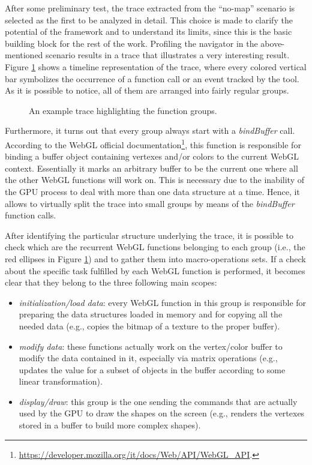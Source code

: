 After some preliminary test, the trace extracted from the ``no-map'' scenario
is selected as the first to be analyzed in detail. This choice is made
to clarify the potential of the framework and to understand its limits, since
this is the basic building block for the rest of the work.
Profiling the navigator in the above-mentioned scenario results in a trace that
illustrates a very interesting result. Figure \ref{img:no_map_overview}
shows a timeline representation of the trace, where every colored vertical bar
symbolizes the occurrence of a function call or an event tracked by the tool.
As it is possible to notice, all of them are arranged into fairly regular groups.
\begin{figure}[!htb]
    \caption{An example trace highlighting the function groups.}
    \label{img:no_map_overview}
\end{figure}

Furthermore, it turns out that every group always start with a \emph{bindBuffer}
call. According to the WebGL official documentation\footnote{
\url{https://developer.mozilla.org/it/docs/Web/API/WebGL_API}.}, this function is
responsible for binding a buffer object containing vertexes and/or colors to the
current WebGL context. Essentially it marks an arbitrary buffer to be the current
one where all the other WebGL functions will work on. This is necessary due to the
inability of the GPU process to deal with more than one data structure at a time.
Hence, it allows to virtually split the trace into small groups by means of the
\emph{bindBuffer} function calls.

After identifying the particular structure underlying the trace, it is possible to check
which are the recurrent WebGL functions belonging to each group (i.e., the red ellipses
in Figure \ref{img:no_map_overview}) and to gather them into macro-operations sets.
If a check about the specific task fulfilled by each WebGL function is performed, it
becomes clear that they belong to the three following main scopes:
\begin{itemize}
    \item \emph{initialization/load data}: every WebGL function in this group
        is responsible for preparing the data structures loaded in memory
        and for copying all the needed data (e.g., copies the bitmap of a texture
        to the proper buffer).
    \item \emph{modify data}: these functions actually work on the vertex/color
        buffer to modify the data contained in it, especially via matrix
        operations (e.g., updates the value for a subset of objects in the buffer
        according to some linear transformation).
    \item \emph{display/draw}: this group is the one sending the commands
        that are actually used by the GPU to draw the shapes on the screen
        (e.g., renders the vertexes stored in a buffer to build more complex shapes).
\end{itemize}

